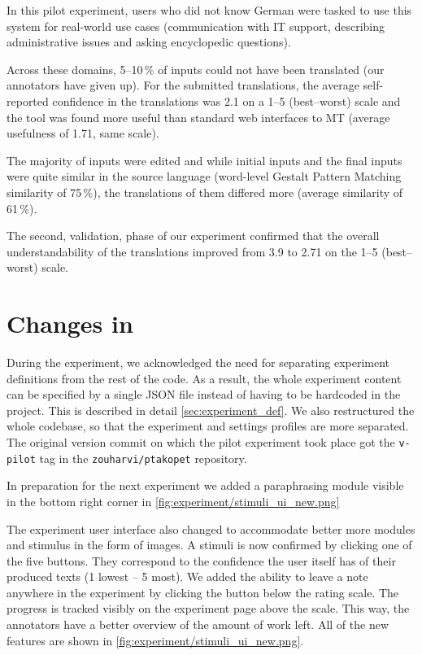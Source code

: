 In this pilot experiment, users who did not know German were tasked to use this system for real-world use cases (communication with IT support, describing administrative issues and asking encyclopedic questions).

Across these domains, 5--10\,\% of inputs could not have been translated (our annotators have given up). For the submitted translations, the average self-reported confidence in the translations was 2.1 on a 1--5 (best--worst) scale and the tool was found more useful than standard web interfaces to MT (average usefulness of 1.71, same scale).

The majority of inputs were edited and while initial inputs and the final inputs were quite similar in the source language (word-level Gestalt Pattern Matching similarity of 75\,\%), the translations of them differed more (average similarity of 61\,\%).

The second, validation, phase of our experiment confirmed that the overall understandability of the translations improved from 3.9 to 2.71 on the 1--5 (best--worst) scale.

\pagebreak
\section{Changes in \ptakopet}
\label{sec:experiment_changes}

During the experiment, we acknowledged the need for separating experiment definitions from the rest of the code. As a result, the whole experiment content can be specified by a single JSON file instead of having to be hardcoded in the project. This is described in detail \cref{sec:experiment_def}. We also restructured the whole codebase, so that the experiment and settings profiles are more separated. The original version commit on which the pilot experiment took place got the \texttt{v-pilot} tag in the \texttt{zouharvi/ptakopet} repository.

In preparation for the next experiment we added a paraphrasing module visible in the bottom right corner in \cref{fig:experiment/stimuli_ui_new.png}

The experiment user interface also changed to accommodate better more modules and stimulus in the form of images. A stimuli is now confirmed by clicking one of the five buttons. They correspond to the confidence the user itself has of their produced texts (1 lowest -- 5 most). We added the ability to leave a note anywhere in the experiment by clicking the  button below the rating scale. The progress is tracked visibly on the experiment page above the scale. This way, the annotators have a better overview of the amount of work left. All of the new features are shown in \cref{fig:experiment/stimuli_ui_new.png}.

